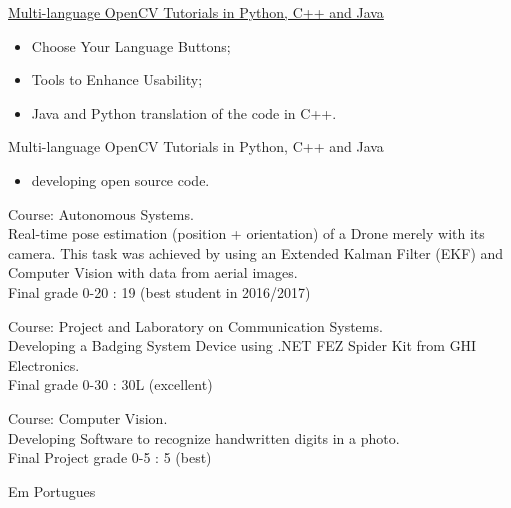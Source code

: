 \documentclass{article}
\begin{document}
\begin{llist}
{
\href{https://summerofcode.withgoogle.com/archive/2016/projects/6414610965987328/}{Multi-language OpenCV Tutorials in Python, C++ and Java}
\vspace{-0.33cm}
\begin{itemize}
\item[\textendash] Choose Your Language Buttons;
\item[\textendash] Tools to Enhance Usability;
\item[\textendash] Java and Python translation of the code in C++.
\end{itemize}
}
{
Multi-language OpenCV Tutorials in Python, C++ and Java
\vspace{-0.33cm}
\begin{itemize}
 \item developing open source code.
\end{itemize}
}

{
\vspace{-0.4cm}

 
Course: Autonomous Systems.\\
Real-time pose estimation (position + orientation) of a Drone merely with its camera. This task was achieved by using an Extended Kalman Filter (EKF) and Computer Vision with data from aerial images.\\
Final grade 0-20 : 19 (best student in 2016/2017)

 
Course: Project and Laboratory on Communication	Systems.\\
Developing a Badging System Device using .NET FEZ Spider Kit from GHI Electronics.\\
Final grade 0-30 : 30L (excellent)

 
Course: Computer Vision.\\
Developing Software to recognize handwritten digits in a photo.\\
Final Project grade 0-5 : 5 (best)

}
{

Em Portugues

}
\end{llist}
\end{document}

